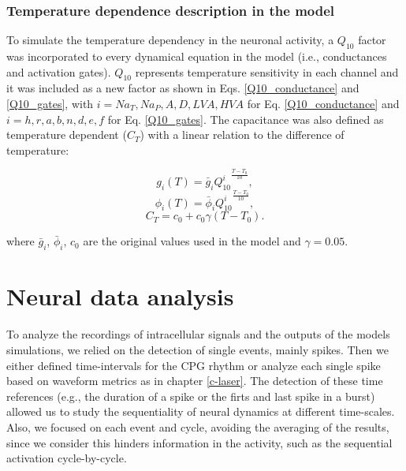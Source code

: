 \subsubsection{Temperature dependence description in the model}
\label{sec:model equations temperature}
To simulate the temperature dependency in the neuronal activity, a $Q_{10}$ factor was incorporated to every dynamical equation in the model (i.e., conductances and activation gates). $Q_{10}$ represents temperature sensitivity in each channel and it was included as a new factor as shown in Eqs. \ref{Q10_conductance} and \ref{Q10_gates}, with $i=Na_T,Na_P,A,D,LVA,HVA$ for Eq. \ref{Q10_conductance} and $i=h,r,a,b,n,d,e,f$ for Eq. \ref{Q10_gates}. The capacitance was also defined as temperature dependent ($C_T$) with a linear relation to the difference of temperature: 

\begin{equation}g_i(T)=\bar{g}_i{Q^i_{10}}^{\frac{T-T_0}{10}},
\label{Q10_conductance}
\end{equation}
\begin{equation}\phi_i(T)=\bar{\phi}_i{Q^i_{10}}^{\frac{T-T_0}{10}},
\label{Q10_gates}\end{equation}
\begin{equation}C_T=c_0 + c_0 \gamma(T-T_0).\end{equation}


where $\bar{g}_i$, $\bar{\phi}_i$, $c_0$ are the original values used in the model and $\gamma = 0.05$.

 
\section{Neural data analysis}

To analyze the recordings of intracellular signals and the outputs of the models simulations, we relied on the detection of single events, mainly spikes. Then we either defined time-intervals for the CPG rhythm or analyze each single spike based on waveform metrics as in chapter \ref{c-laser}. The detection of these time references (e.g., the duration of a spike or the firts and last spike in a burst) allowed us to study the sequentiality of neural dynamics at different time-scales. Also, we focused on each event and cycle, avoiding the averaging of the results, since we consider this hinders information in the activity, such as the sequential activation cycle-by-cycle. 

